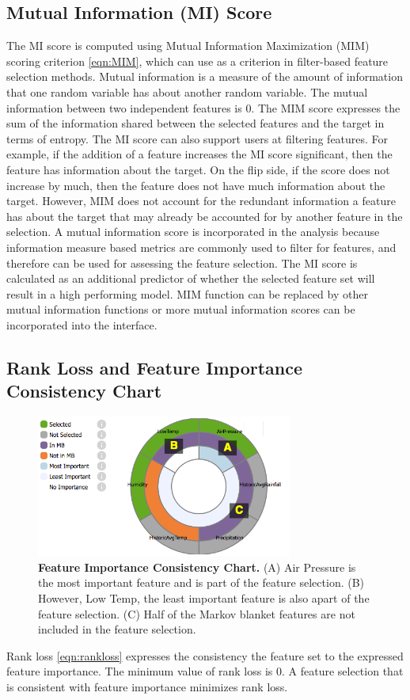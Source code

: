 \subsection{Mutual Information (MI) Score}
The MI score is computed using Mutual Information Maximization (MIM) scoring criterion \ref{eqn:MIM}, which can use as a criterion in filter-based feature selection methods. Mutual information is a measure of the amount of information that one random variable has about another random variable. The mutual information between two independent features is 0. The MIM score expresses the sum of the information shared between the selected features and the target in terms of entropy. The MI score can also support users at filtering features. For example, if the addition of a feature increases the MI score significant, then the feature has information about the target. On the flip side, if the score does not increase by much, then the feature does not have much information about the target. However, MIM does not account for the redundant information a feature has about the target that may already be accounted for by another feature in the selection. 
A mutual information score is incorporated in the analysis because information measure based metrics are commonly used to filter for features, and therefore can be used for assessing the feature selection. The MI score is calculated as an additional predictor of whether the selected feature set will result in a high performing model. MIM function can be replaced by other mutual information functions or more mutual information scores can be incorporated into the interface. 

\subsection{Rank Loss and Feature Importance Consistency Chart}
\begin{figure}[!htbp]
\centering
\includegraphics[width=0.75\textwidth]{SunburstChartLabeled}
\caption{\textbf{Feature Importance Consistency Chart.} (A) Air Pressure is the most important feature and is part of the feature selection. (B) However, Low Temp, the least important feature is also apart of the feature selection. (C) Half of the Markov blanket features are not included in the feature selection.} \label{fig:SunburstChart}
\end{figure}
Rank loss \ref{eqn:rankloss} expresses the consistency the feature set to the expressed feature importance. The minimum value of rank loss is 0. A feature selection that is consistent with feature importance minimizes rank loss. 

